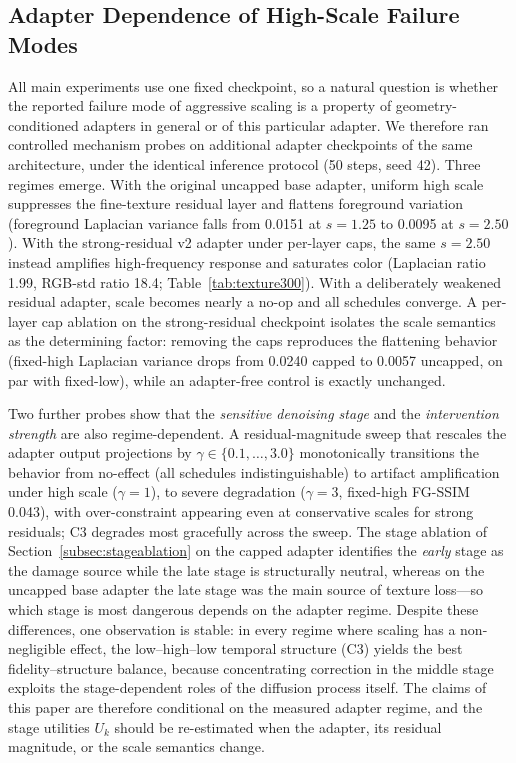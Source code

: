 \subsection{Adapter Dependence of High-Scale Failure Modes}
\label{subsec:adapterdep}
All main experiments use one fixed checkpoint, so a natural question is whether the reported failure mode of aggressive scaling is a property of geometry-conditioned adapters in general or of this particular adapter. We therefore ran controlled mechanism probes on additional adapter checkpoints of the same architecture, under the identical inference protocol (50 steps, seed 42). Three regimes emerge. With the original uncapped base adapter, uniform high scale suppresses the fine-texture residual layer and flattens foreground variation (foreground Laplacian variance falls from 0.0151 at $s{=}1.25$ to 0.0095 at $s{=}2.50$). With the strong-residual v2 adapter under per-layer caps, the same $s{=}2.50$ instead amplifies high-frequency response and saturates color (Laplacian ratio 1.99, RGB-std ratio 18.4; Table~\ref{tab:texture300}). With a deliberately weakened residual adapter, scale becomes nearly a no-op and all schedules converge. A per-layer cap ablation on the strong-residual checkpoint isolates the scale semantics as the determining factor: removing the caps reproduces the flattening behavior (fixed-high Laplacian variance drops from 0.0240 capped to 0.0057 uncapped, on par with fixed-low), while an adapter-free control is exactly unchanged.

Two further probes show that the \emph{sensitive denoising stage} and the \emph{intervention strength} are also regime-dependent. A residual-magnitude sweep that rescales the adapter output projections by $\gamma\in\{0.1,\ldots,3.0\}$ monotonically transitions the behavior from no-effect (all schedules indistinguishable) to artifact amplification under high scale ($\gamma{=}1$), to severe degradation ($\gamma{=}3$, fixed-high FG-SSIM 0.043), with over-constraint appearing even at conservative scales for strong residuals; C3 degrades most gracefully across the sweep. The stage ablation of Section~\ref{subsec:stageablation} on the capped adapter identifies the \emph{early} stage as the damage source while the late stage is structurally neutral, whereas on the uncapped base adapter the late stage was the main source of texture loss---so which stage is most dangerous depends on the adapter regime. Despite these differences, one observation is stable: in every regime where scaling has a non-negligible effect, the low--high--low temporal structure (C3) yields the best fidelity--structure balance, because concentrating correction in the middle stage exploits the stage-dependent roles of the diffusion process itself. The claims of this paper are therefore conditional on the measured adapter regime, and the stage utilities $U_k$ should be re-estimated when the adapter, its residual magnitude, or the scale semantics change.

